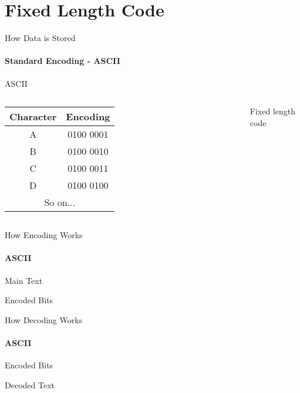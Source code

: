 \section{Fixed Length Code}
\begin{frame}{How Data is Stored}
\framesubtitle{Standard Encoding - ASCII}
    \begin{block}{\centering}
        \centering
        ASCII
    \end{block}
    \begin{columns}
\begin{table}[]
\begin{tabular}{c|c}
Character     & Encoding    \pause\\ \hline
A             & 0100 0001     \pause\\ 
B             & 0100 0010     \pause\\
C             & 0100 0011     \pause\\
D             & 0100 0100     \pause\\
\multicolumn{2}{c}{So on...}
\end{tabular}
\end{table}
    \pause 
    \begin{exampleblock}{\centering}
    \centering
        \large{\alert{Fixed length code}}
    \end{exampleblock}
    \end{columns}
\end{frame}
\begin{frame}{How Encoding Works}
\framesubtitle{ASCII}
    \pause
    \begin{block}{\centering Main Text}
        \centering
         
    \end{block}
    \pause
    \begin{block}{\centering Encoded Bits}
        \centering
    \end{block}
\end{frame}
\begin{frame}{How Decoding Works}
\framesubtitle{ASCII}
    \begin{block}{\centering Encoded Bits}
        \centering
         
    \end{block}
    \pause
    \begin{block}{\centering Decoded Text}
        \centering
        \only<5->{\AText{A}}
    \end{block}
\end{frame}
